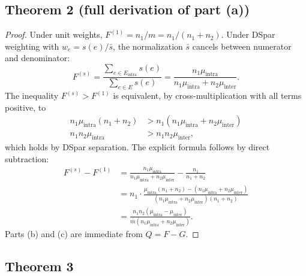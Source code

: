 \documentclass[10pt,journal,compsoc]{IEEEtran}
\begin{document}
\subsection{Theorem 2 (full derivation of part (a))}

\begin{proof}
Under unit weights, $F^{(1)} = n_1/m = n_1/(n_1 + n_2)$.
Under DSpar weighting with $w_e = s(e)/\bar{s}$, the normalization $\bar{s}$ cancels between numerator and denominator:
\begin{equation}
F^{(s)} = \frac{\sum_{e \in E_{\text{intra}}} s(e)}{\sum_{e \in E} s(e)} = \frac{n_1 \mu_{\text{intra}}}{n_1 \mu_{\text{intra}} + n_2 \mu_{\text{inter}}}.
\end{equation}
The inequality $F^{(s)} > F^{(1)}$ is equivalent, by cross-multiplication with all terms positive, to
\begin{align}
n_1 \mu_{\text{intra}} (n_1 + n_2) &> n_1 (n_1 \mu_{\text{intra}} + n_2 \mu_{\text{inter}}) \\
n_1 n_2 \mu_{\text{intra}} &> n_1 n_2 \mu_{\text{inter}},
\end{align}
which holds by DSpar separation.
The explicit formula follows by direct subtraction:
\begin{align}
F^{(s)} - F^{(1)} &= \frac{n_1 \mu_{\text{intra}}}{n_1 \mu_{\text{intra}} + n_2 \mu_{\text{inter}}} - \frac{n_1}{n_1 + n_2} \\
&= n_1 \cdot \frac{\mu_{\text{intra}}(n_1 + n_2) - (n_1 \mu_{\text{intra}} + n_2 \mu_{\text{inter}})}{(n_1 \mu_{\text{intra}} + n_2 \mu_{\text{inter}})(n_1 + n_2)} \\
&= \frac{n_1 n_2 (\mu_{\text{intra}} - \mu_{\text{inter}})}{m(n_1 \mu_{\text{intra}} + n_2 \mu_{\text{inter}})}.
\end{align}
Parts (b) and (c) are immediate from $Q = F - G$.
\end{proof}

\subsection{Theorem 3}
\end{document}
